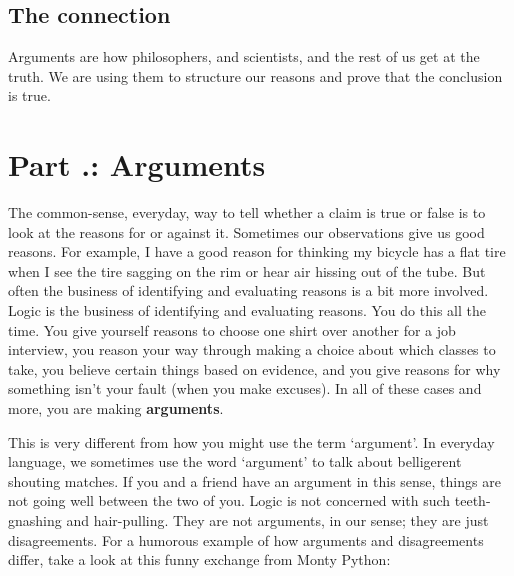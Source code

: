 \subsection{The connection}

Arguments are how philosophers, and scientists, and the rest of us get at the truth. We are using them to structure our reasons and prove that the conclusion is true.

\section{Part \thechapcount.\theseccount: Arguments}
\label{s:p1.2}


The common-sense, everyday, way to tell whether a claim is true or false is to look at the reasons for or against it. Sometimes our observations give us good reasons. For example, I have a good reason for thinking my bicycle has a flat tire when I see the tire sagging on the rim or hear air hissing out of the tube. But often the business of identifying and evaluating reasons is a bit more involved. Logic is the business of identifying and evaluating reasons. You do this all the time. You give yourself reasons to choose one shirt over another for a job interview, you reason your way through making a choice about which classes to take, you believe certain things based on evidence, and you give reasons for why something isn't your fault (when you make excuses). In all of these cases and more, you are making \textbf{arguments}.

This is very different from how you might use the term ‘argument'. In everyday language, we sometimes use the word ‘argument’ to talk about belligerent shouting matches. If you and a friend have an argument in this sense, things are not going well between the two of you. Logic is not concerned with such teeth-gnashing and hair-pulling. They are not arguments, in our sense; they are just disagreements. For a humorous example of how arguments and disagreements differ, take a look at this funny exchange from Monty Python:\autocite{ArgumentClinic}

